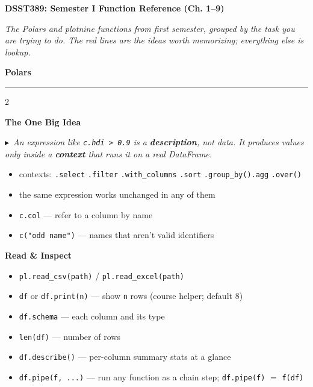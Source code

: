 \documentclass[11pt, a4paper]{article}
\newcommand{\code}[1]{\textcolor{codecolor}{\texttt{#1}}}
\newcommand{\head}[1]{\smallskip\textbf{#1}\par\smallskip}
\newcommand{\bighead}[1]{{\large\textbf{#1}}\par\smallskip\hrule\medskip}
\newcommand{\key}[1]{\textcolor{keycolor}{$\blacktriangleright$~\textit{#1}}\par\smallskip}
\begin{document}
\small
\sloppy

\begin{center}
\normalsize\textbf{DSST389: Semester I Function Reference (Ch. 1--9)}
\end{center}

\smallskip

\textit{The Polars and plotnine functions from first semester, grouped by the task you are trying to do. The red lines are the ideas worth memorizing; everything else is lookup.}

\bigskip

\bighead{Polars}

\begin{multicols}{2}

\head{The One Big Idea}
\key{An expression like \code{c.hdi > 0.9} is a \textbf{description}, not data. It produces values only inside a \textbf{context} that runs it on a real DataFrame.}
\begin{itemize}
  \item contexts: \code{.select} \code{.filter} \code{.with\_columns} \code{.sort} \code{.group\_by().agg} \code{.over()}
  \item the same expression works unchanged in any of them
  \item \code{c.col} --- refer to a column by name
  \item \code{c("odd name")} --- names that aren't valid identifiers
\end{itemize}

\head{Read \& Inspect}
\begin{itemize}
  \item \code{pl.read\_csv(path)} / \code{pl.read\_excel(path)}
  \item \code{df} or \code{df.print(n)} --- show \code{n} rows (course helper; default 8)
  \item \code{df.schema} --- each column and its type
  \item \code{len(df)} --- number of rows
  \item \code{df.describe()} --- per-column summary stats at a glance
  \item \code{df.pipe(f, ...)} --- run any function as a chain step; \code{df.pipe(f)} $=$ \code{f(df)}
\end{itemize}


\end{multicols}
\end{document}
